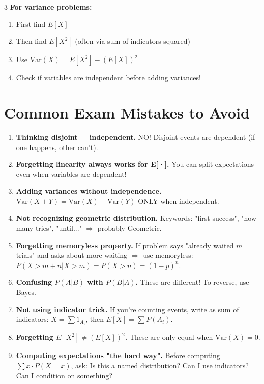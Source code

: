 \documentclass[10pt,landscape]{article}
\begin{document}
\begin{multicols}{3}
\textbf{For variance problems:}
\begin{enumerate}[leftmargin=*,noitemsep,topsep=0pt]
\item First find $E[X]$
\item Then find $E[X^2]$ (often via sum of indicators squared)
\item Use $\text{Var}(X) = E[X^2] - (E[X])^2$
\item Check if variables are independent before adding variances!
\end{enumerate}

\section{Common Exam Mistakes to Avoid}

\begin{enumerate}[leftmargin=*,noitemsep,topsep=0pt]
\item \textbf{Thinking disjoint = independent.} NO! Disjoint events are dependent (if one happens, other can't).

\item \textbf{Forgetting linearity always works for E[·].} You can split expectations even when variables are dependent!

\item \textbf{Adding variances without independence.} $\text{Var}(X+Y) = \text{Var}(X) + \text{Var}(Y)$ ONLY when independent.

\item \textbf{Not recognizing geometric distribution.} Keywords: "first success", "how many tries", "until..." $\Rightarrow$ probably Geometric.

\item \textbf{Forgetting memoryless property.} If problem says "already waited $m$ trials" and asks about more waiting $\Rightarrow$ use memoryless: $P(X > m+n | X > m) = P(X > n) = (1-p)^n$.

\item \textbf{Confusing $P(A|B)$ with $P(B|A)$.} These are different! To reverse, use Bayes.

\item \textbf{Not using indicator trick.} If you're counting events, write as sum of indicators: $X = \sum 1_{A_i}$, then $E[X] = \sum P(A_i)$.

\item \textbf{Forgetting $E[X^2] \neq (E[X])^2$.} These are only equal when $\text{Var}(X) = 0$.

\item \textbf{Computing expectations "the hard way".} Before computing $\sum x \cdot P(X=x)$, ask: Is this a named distribution? Can I use indicators? Can I condition on something?
\end{enumerate}


\end{multicols}
\end{document}
